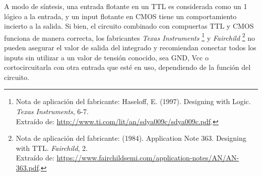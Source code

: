 A modo de síntesis, una entrada flotante en un TTL es considerada como un 1 lógico a la entrada, y un input flotante en CMOS tiene un comportamiento incierto
a la salida. Si bien, el circuito combinado con compuertas TTL y CMOS funciona de manera correcta, los fabricantes \textit{Texas Instruments}
\footnote{Nota de aplicación del fabricante:
Haseloff, E. (1997). Designing with Logic. \textit{Texas Instruments}, 6-7. \\Extraído de: \url{http://www.ti.com/lit/an/sdya009c/sdya009c.pdf}.} 
y \textit{Fairchild} 
\footnote{Nota de aplicación del fabricante:
(1984). Application Note 363. Designing with TTL. \textit{Fairchild}, 2. \\Extraído de: \url{https://www.fairchildsemi.com/application-notes/AN/AN-363.pdf}.} 
no pueden asegurar el valor de salida del integrado y recomiendan conectar todos los inputs sin utilizar a un valor de tensión conocido, sea GND, Vcc o cortocircuitarla con otra entrada que esté en uso, dependiendo de la función del circuito.
